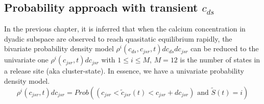 \subsection{Probability approach with transient $c_{ds}$}
\label{sec:prob-appr-moment}

In the previous chapter, it is inferred that when the calcium
concentration in dyadic subspace are observed to reach quasitatic
equilibrium rapidly, the bivariate probability density model
$\rho^i(c_{ds},c_{jsr},t) dc_{ds}dc_{jsr}$ can be reduced to the
univariate one $\rho^i(c_{jsr},t)dc_{jsr}$ with $1 \le i \le M$,
$M=12$ is the number of states in a release site (aka
cluster-state). In essence, we have a univariate probability density
model.
\begin{equation}
  \label{eq:202}
  \rho^i(c_{jsr},t) dc_{jsr} =  Prob \left((c_{jsr}<\tilde{c}_{jsr}(t) <
    c_{jsr} + dc_{jsr}) \text{ and } \tilde{S}(t)=i \right)
\end{equation}


